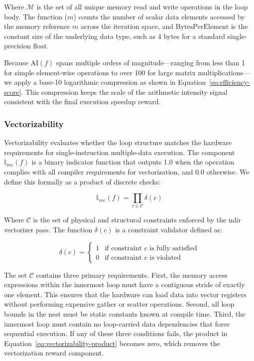 Where $\mathcal{M}$ is the set of all unique memory read and write operations in the loop body. The function ($m$) counts the number of scalar data elements accessed by the memory reference $m$ across the iteration space, and $\text{BytesPerElement}$ is the constant size of the underlying data type, such as 4 bytes for a standard single-precision float.

Because $\text{AI}(f)$ spans multiple orders of magnitude—ranging from less than 1 for simple element-wise operations to over 100 for large matrix multiplications—we apply a base-10 logarithmic compression as shown in Equation~\ref{eq:efficiency-score}. This compression keeps the scale of the arithmetic intensity signal consistent with the final execution speedup reward.

\subsubsection{Vectorizability}
Vectorizability evaluates whether the loop structure matches the hardware requirements for single-instruction multiple-data execution. The component $\mathbb{I}_\text{vec}(f)$ is a binary indicator function that outputs 1.0 when the operation complies with all compiler requirements for vectorization, and 0.0 otherwise. We define this formally as a product of discrete checks:

\begin{equation}
    \mathbb{I}_\text{vec}(f) = \prod_{c \in \mathcal{C}} \delta(c)
    \label{eq:vectorizability-product}
\end{equation}

Where $\mathcal{C}$ is the set of physical and structural constraints enforced by the \gls{mlir} vectorizer pass. The function $\delta(c)$ is a constraint validator defined as:

\begin{equation}
    \delta(c) = \begin{cases}
        1 & \text{if constraint } c \text{ is fully satisfied} \\
        0 & \text{if constraint } c \text{ is violated}
    \end{cases}
    \label{eq:constraint-validator}
\end{equation}

The set $\mathcal{C}$ contains three primary requirements. First, the memory access expressions within the innermost loop must have a contiguous stride of exactly one element. This ensures that the hardware can load data into vector registers without performing expensive gather or scatter operations. Second, all loop bounds in the nest must be static constants known at compile time. Third, the innermost loop must contain no loop-carried data dependencies that force sequential execution. If any of these three conditions fails, the product in Equation~\ref{eq:vectorizability-product} becomes zero, which removes the vectorization reward component.

